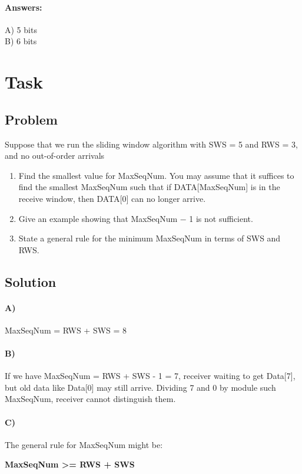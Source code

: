 \documentclass[12pt]{article}
\begin{document}
        \paragraph{Answers:} A) 5 bits\\ \hspace*{62} B) 6 bits

    \newpage


    \section{Task}\label{sec:task-4}
    \subsection{Problem}
    Suppose that we run the sliding window algorithm with SWS = 5 and RWS = 3,
        and no out-of-order arrivals
        \begin{enumerate}[label=(\alph*)]
            \item Find the smallest value for MaxSeqNum.
            You may assume that it suffices to find the smallest MaxSeqNum such
            that if DATA[MaxSeqNum] is in the receive window, then DATA[0] can no longer arrive.
            \item Give an example showing that MaxSeqNum − 1 is not sufficient.
            \item State a general rule for the minimum MaxSeqNum in terms of SWS and RWS.
        \end{enumerate}


    \subsection{Solution}
        \paragraph{A)} MaxSeqNum = RWS + SWS = 8
        \paragraph{B)} If we have MaxSeqNum = RWS + SWS - 1 = 7, receiver waiting to get Data[7],
    but old data like Data[0] may still arrive.
    Dividing 7 and 0 by module such MaxSeqNum, receiver cannot distinguish them.
        \paragraph{C)} The general rule for MaxSeqNum might be:
        \begin{center}
               \textbf{MaxSeqNum >= RWS + SWS}
        \end{center}
\end{document}
